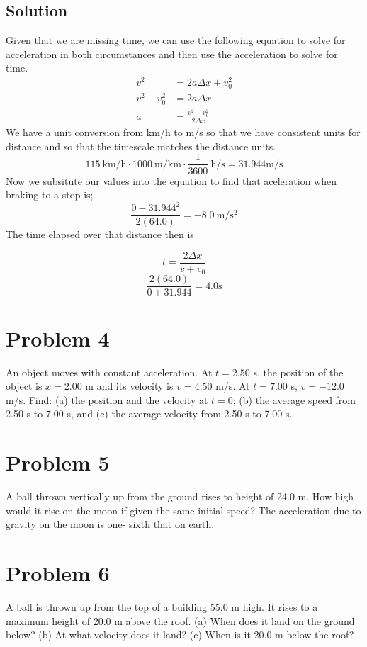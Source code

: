 \documentclass{article}
\begin{document}
\subsection*{Solution}
Given that we are missing time, we can use the following equation to solve for acceleration in both circumstances and then use the acceleration to solve for time.
\begin{align*}
	v^2 &= 2a \Delta x + v_0^2 \\
	v^2  - v_0^2 &= 2a \Delta x \\
	a &= \frac{v^2  - v_0^2}{2\Delta x}
\end{align*}
We have a unit conversion from km/h to m/s so that we have consistent units for distance and so that the timescale matches the distance units.
\[
	115\ \unit{\kilo\meter\per\hour} \cdot 1000\ \unit{\meter\per\kilo\meter} \cdot \frac{1}{3600}\ \unit{\hour\per\second} = 31.944 \unit{\meter\per\second}
\]
Now we subsitute our values into the equation to find that aceleration when braking to a stop is;
\[
	\frac{0 - 31.944^2}{2\left(64.0\right)} = -8.0\ \unit{\meter\per\second^2}
\]
The time elapsed over that distance then is

\[
	t = \frac{2 \Delta x}{v + v_0}
\]
\[
	\frac{2 (64.0)}{0 + 31.944} = 4.0 \unit{\second}
\]

\section*{Problem 4}
An object moves with constant acceleration. At $t = 2.50$ s, the position of the object is
$x = 2.00$ m and its velocity is $v = 4.50$ m/s. At $t = 7.00$ s, $v = -12.0$ m/s. Find: (a) the
position and the velocity at $t = 0$; (b) the average speed from 2.50 s to 7.00 s, and (c) the
average velocity from 2.50 s to 7.00 s.

\section*{Problem 5}
A ball thrown vertically up from the ground rises to height of 24.0 m. How high would it rise
on the moon if given the same initial speed? The acceleration due to gravity on the moon is one-
sixth that on earth.

\section*{Problem 6}
A ball is thrown up from the top of a building 55.0 m high. It rises to a maximum height
of 20.0 m above the roof. (a) When does it land on the ground below? (b) At what velocity
does it land? (c) When is it 20.0 m below the roof?
\end{document}
